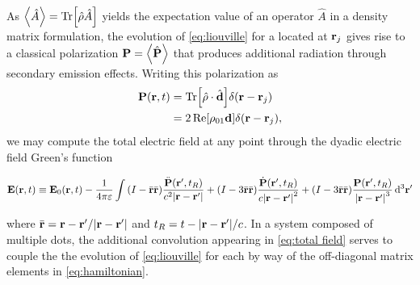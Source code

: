 As $\expval{\hat{A}} = \Tr[\hat{\rho}\hat{A}]$ yields the expectation value of an operator $\hat{A}$ in a density matrix formulation, the evolution of \cref{eq:liouville} for a \qd{} located at $\vb{r}_j$ gives rise to a classical polarization $\vb{P} = \expval{\hat{\vb{P}}}$ that produces additional radiation through secondary emission effects.
Writing this polarization as
\begin{equation}
  \begin{aligned}
    \vb{P}(\vb{r}, t) &= \Tr[\hat{\rho} \cdot \hat{\vb{d}}] \delta(\vb{r} - \vb{r}_j) \\
                      &= 2 \Re[\rho_{01}\vb{d}]\delta(\vb{r} - \vb{r}_j),
  \end{aligned}
\end{equation}
we may compute the total electric field at any point through the dyadic electric field Green's function~\cite{Rothwell2009}
\begin{widetext}
  \begin{equation}
    \vb{E}(\vb{r}, t) \equiv \vb{E}_0(\vb{r}, t) - \frac{1}{4\pi\varepsilon} \int
      \qty(I - \bar{\vb{r}} \bar{\vb{r}}) \frac{\ddot{\vb{P}}(\vb{r}', t_R)}{c^2\abs{\vb{r} - \vb{r}'}} +
      \qty(I - 3\bar{\vb{r}} \bar{\vb{r}}) \frac{\dot{\vb{P}}(\vb{r}', t_R)}{c\abs{\vb{r} - \vb{r}'}^2} +
      \qty(I - 3\bar{\vb{r}} \bar{\vb{r}}) \frac{\vb{P}(\vb{r}', t_R)}{\abs{\vb{r} - \vb{r}'}^3}
    \dd[3]{\vb{r}'}
    \label{eq:total field}
  \end{equation}
\end{widetext}
where $\bar{\vb{r}} = \vb{r} - \vb{r}'/\abs{\vb{r} - \vb{r}'}$ and $t_R = t - \abs{\vb{r} - \vb{r}'}/c$.
In a system composed of multiple dots, the additional convolution appearing in \cref{eq:total field} serves to couple the the evolution of \cref{eq:liouville} for each \qd{} by way of the off-diagonal matrix elements in \cref{eq:hamiltonian}.
